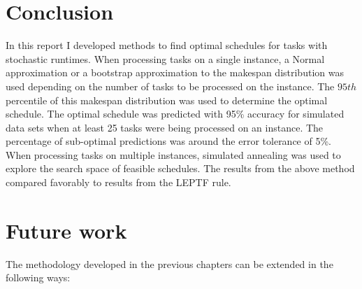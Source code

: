 \documentclass[12pt]{report}
\begin{document}
\section{Conclusion}

In this report I developed methods to find optimal schedules for tasks with stochastic runtimes. 
When processing tasks on a single instance, a Normal approximation or a bootstrap approximation to the makespan distribution was used depending on the number of tasks to be processed on the instance.
The $95th$ percentile of this makespan distribution was used to determine the optimal schedule.
The optimal schedule was predicted with 95\% accuracy for simulated data sets when at least 25 tasks were being processed on an instance. 
The percentage of sub-optimal predictions was around the error tolerance of 5\%. 
When processing tasks on multiple instances, simulated annealing was used to explore the search space of feasible schedules.
The results from the above method compared favorably to results from the LEPTF rule.

\section{Future work}

The methodology developed in the previous chapters can be extended in the following ways:
\end{document}
